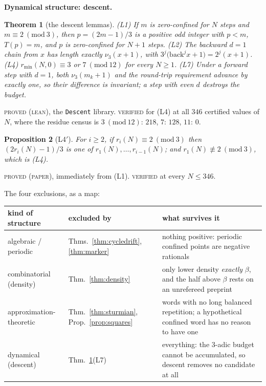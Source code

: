 \documentclass[11pt,reqno]{amsart}
\theoremstyle{plain}
\newtheorem{theorem}{Theorem}[section]
\newtheorem{proposition}[theorem]{Proposition}
\theoremstyle{definition}
\newcommand{\vth}{\nu_3}
\newcommand{\lab}[1]{\textnormal{\textsc{\small #1}}}
\begin{document}
\medskip
\noindent\textbf{Dynamical structure: descent.}

\begin{theorem}[the descent lemmas]\label{thm:descent}
\textup{(L1)} If $m$ is zero-confined for $N$ steps and $m\equiv2\ (\mathrm{mod}\ 3)$,
then $p=(2m-1)/3$ is a positive odd integer with $p<m$, $T(p)=m$, and $p$ is
zero-confined for $N+1$ steps.
\textup{(L2)} The backward $d=1$ chain from $x$ has length exactly $\vth(x+1)$,
with $3^{j}\bigl(\mathrm{back}^{j}x+1\bigr)=2^{j}(x+1)$.
\textup{(L4)} $r_{\min}(N,0)\equiv3$ or $7\ (\mathrm{mod}\ 12)$ for every $N\ge1$.
\textup{(L7)} Under a forward step with $d=1$, both $\vth(m_k+1)$ and the
round-trip requirement advance by exactly one, so their difference is invariant;
a step with even $d$ destroys the budget.
\end{theorem}
\lab{proved (lean)}, the \texttt{Descent} library. \lab{verified} for (L4) at all
$346$ certified values of $N$, where the residue census is
$3\ (\mathrm{mod}\ 12)$: $218$, $7$: $128$, $11$: $0$.

\begin{proposition}[L4$'$]\label{prop:l4prime}
For $i\ge2$, if $r_i(N)\equiv2\ (\mathrm{mod}\ 3)$ then $(2r_i(N)-1)/3$ is one of
$r_1(N),\dots,r_{i-1}(N)$; and $r_1(N)\not\equiv2\ (\mathrm{mod}\ 3)$, which is
\textup{(L4)}.
\end{proposition}
\lab{proved (paper)}, immediately from (L1). \lab{verified} at every $N\le346$.

\medskip
\noindent The four exclusions, as a map:

\begin{center}\small
\begin{tabular}{@{}llp{}@{}}
\toprule
kind of structure & excluded by & what survives it\\
\midrule
algebraic / periodic & Thms.~\ref{thm:cycledrift}, \ref{thm:marker}
& nothing positive: periodic confined points are negative rationals\\
combinatorial (density) & Thm.~\ref{thm:density}
& only lower density \emph{exactly} $\beta$, and the half above $\beta$ rests on
an unrefereed preprint\\
approximation-theoretic & Thm.~\ref{thm:sturmian}, Prop.~\ref{prop:squares}
& words with no long balanced repetition; a hypothetical confined word has no
reason to have one\\
dynamical (descent) & Thm.~\ref{thm:descent}(L7)
& everything: the $3$-adic budget cannot be accumulated, so descent removes no
candidate at all\\
\bottomrule
\end{tabular}
\end{center}
\end{document}
